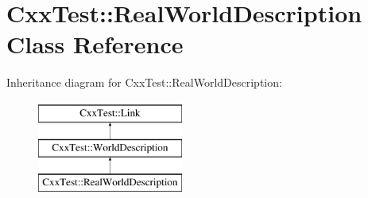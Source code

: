 \hypertarget{classCxxTest_1_1RealWorldDescription}{\section{Cxx\-Test\-:\-:Real\-World\-Description Class Reference}
\label{classCxxTest_1_1RealWorldDescription}
}
Inheritance diagram for Cxx\-Test\-:\-:Real\-World\-Description\-:\begin{figure}[H]
\begin{center}
\leavevmode
\includegraphics[height=3.000000cm]{classCxxTest_1_1RealWorldDescription}
\end{center}
\end{figure}
